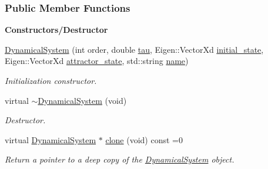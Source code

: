 \subsubsection*{Public Member Functions}
\begin{Indent}{\bf Constructors/\+Destructor}\par
\begin{DoxyCompactItemize}
\item 
\hyperlink{classDmpBbo_1_1DynamicalSystem_a462231c16d651ba070ec880d1f2fd0b1}{Dynamical\+System} (int order, double \hyperlink{group__DynamicalSystems_ga50eec7ad4c9664b5809ace45b22200d5}{tau}, Eigen\+::\+Vector\+Xd \hyperlink{group__DynamicalSystems_ga4c7f24e7deec1629548a075015bdc693}{initial\+\_\+state}, Eigen\+::\+Vector\+Xd \hyperlink{group__DynamicalSystems_gaebe3c462bc4a725cb17bcc3d13285f13}{attractor\+\_\+state}, std\+::string \hyperlink{group__DynamicalSystems_gacd23346c798f78014a4f82c853e83c88}{name})
\begin{DoxyCompactList}\small\item\em Initialization constructor. \end{DoxyCompactList}\item 
\hypertarget{classDmpBbo_1_1DynamicalSystem_aefaeac2137a3b1625028577409049674}{virtual \hyperlink{classDmpBbo_1_1DynamicalSystem_aefaeac2137a3b1625028577409049674}{$\sim$\+Dynamical\+System} (void)}\label{classDmpBbo_1_1DynamicalSystem_aefaeac2137a3b1625028577409049674}

\begin{DoxyCompactList}\small\item\em Destructor. \end{DoxyCompactList}\item 
virtual \hyperlink{classDmpBbo_1_1DynamicalSystem}{Dynamical\+System} $\ast$ \hyperlink{classDmpBbo_1_1DynamicalSystem_a8f7224307c260c899631afd44e4717a0}{clone} (void) const =0
\begin{DoxyCompactList}\small\item\em Return a pointer to a deep copy of the \hyperlink{classDmpBbo_1_1DynamicalSystem}{Dynamical\+System} object. \end{DoxyCompactList}\end{DoxyCompactItemize}
\end{Indent}
